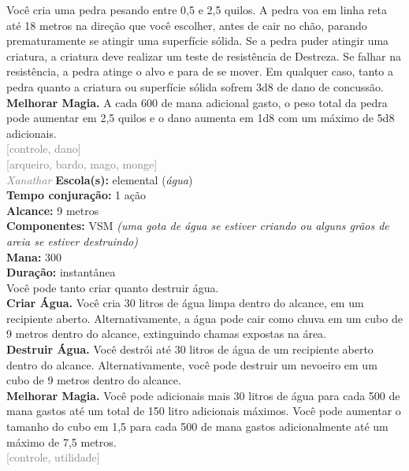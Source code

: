 \documentclass{RPG_Adventure}[2021/10/20]
\begin{document}
{\normalsize Você cria uma pedra pesando entre 0,5 e 2,5 quilos. A pedra voa em linha reta até 18 metros na direção que você escolher, antes de cair no chão, parando prematuramente se atingir uma superfície sólida. Se a pedra puder atingir uma criatura, a criatura deve realizar um teste de resistência de Destreza. Se falhar na resistência, a pedra atinge o alvo e para de se mover. Em qualquer caso, tanto a pedra quanto a criatura ou superfície sólida sofrem 3d8 de dano de concussão.\\\t \textbf{Melhorar Magia.} A cada 600 de mana adicional gasto, o peso total da pedra pode aumentar em 2,5 quilos e o dano aumenta em 1d8 com um máximo de 5d8 adicionais.\\}
{\scriptsize \textcolor{gray}{[controle, dano]\\}}
{\scriptsize \textcolor{gray}{[arqueiro, bardo, mago, monge]\\}}
{\tiny \textcolor{gray}{\textit{Xanathar}}}\jump{}
{\small \t \textbf{Escola(s):} elemental (\textit{água})\\\t \textbf{Tempo conjuração:} 1 ação\\\t \textbf{Alcance:} 9 metros\\\t \textbf{Componentes:} VSM \textit{(uma gota de água se estiver criando ou alguns grãos de areia se estiver destruindo)}\\\t \textbf{Mana:} 300\\\t \textbf{Duração:} instantânea\\}
{\normalsize Você pode tanto criar quanto destruir água.\\\t \textbf{Criar Água.} Você cria 30 litros de água limpa dentro do alcance, em um recipiente aberto. Alternativamente, a água pode cair como chuva em um cubo de 9 metros dentro do alcance, extinguindo chamas expostas na área.\\\t \textbf{Destruir Água.} Você destrói até 30 litros de água de um recipiente aberto dentro do alcance. Alternativamente, você pode destruir um nevoeiro em um cubo de 9 metros dentro do alcance.\\\t \textbf{Melhorar Magia.} Você pode adicionais mais 30 litros de água para cada 500 de mana gastos até um total de 150 litro adicionais máximos. Você pode aumentar o tamanho do cubo em 1,5 para cada 500 de mana gastos adicionalmente até um máximo de 7,5 metros.\\}
{\scriptsize \textcolor{gray}{[controle, utilidade]\\}}
\end{document}
